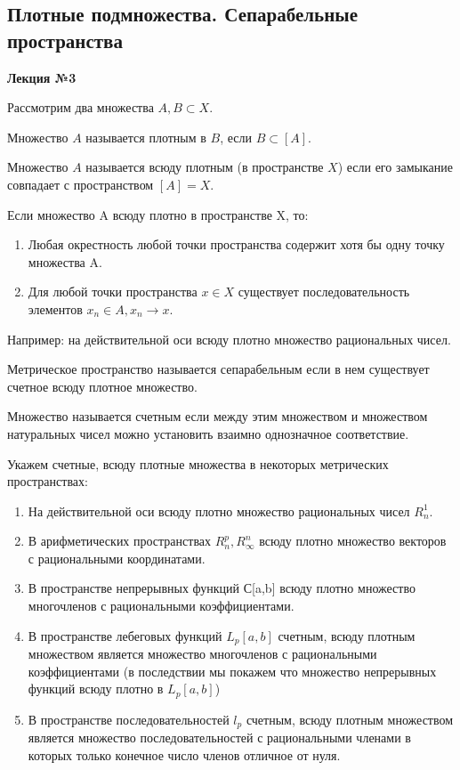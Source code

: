 \documentclass[14pt,a4paper]{extarticle}
\theoremstyle{definition}
\theoremstyle{remark}
\renewcommand{\[}{\begin{dmath*}[compact]}
\renewcommand{\]}{\end{dmath*}}
\begin{document}
\subsection{Плотные подмножества. Сепарабельные пространства}

\textbf{Лекция №3}

Рассмотрим два множества $A, B\subset X$.

Множество $A$ называется плотным в $B$, если $B\subset[A]$.

Множество $A$ называется всюду плотным (в пространстве $X$) если его замыкание
совпадает с пространством $[A]=X$.

Если множество A всюду плотно в пространстве X, то:

\begin{enumerate}
  \item Любая окрестность любой точки пространства содержит хотя бы одну точку
  множества A.

  \item Для любой точки пространства $x \in X$  существует последовательность
  элементов ${x_n}\in A, x_n \to x$.
\end{enumerate}

Например: на действительной оси всюду плотно множество рациональных чисел.

Метрическое пространство называется сепарабельным если в нем существует счетное
всюду плотное множество.

Множество называется счетным если между этим множеством и множеством
натуральных чисел можно установить взаимно однозначное соответствие.

Укажем счетные, всюду плотные множества в некоторых метрических пространствах:

\begin{enumerate}
  \item На действительной оси всюду плотно множество рациональных чисел $R_n^1$.

  \item В арифметических пространствах $R_n^p, R_\infty^n$ всюду плотно
  множество векторов с рациональными координатами.

  \item В пространстве непрерывных функций С[a,b] всюду плотно множество
  многочленов с рациональными коэффициентами.

  \item В пространстве лебеговых функций $L_p[a,b]$ счетным, всюду плотным
  множеством является множество многочленов с рациональными коэффициентами (в
  последствии мы покажем что множество непрерывных функций всюду плотно в
  $L_p[a,b]$)

  \item В пространстве последовательностей $l_p$ счетным, всюду плотным
  множеством является множество последовательностей с рациональными членами в
  которых только конечное число членов отличное от нуля.
\end{enumerate}
\end{document}
